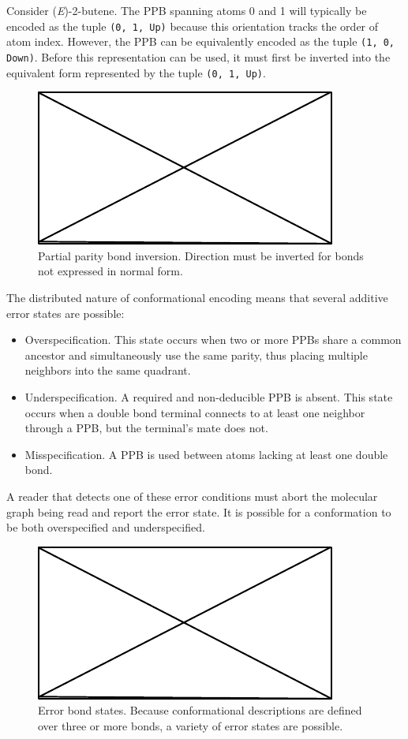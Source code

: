 \documentclass{article}
\def\ttt{\texttt}
\begin{document}
Consider (\textit{E})-2-butene. The PPB spanning atoms 0 and 1 will typically be encoded as the tuple \ttt{(0, 1, Up)} because this orientation tracks the order of atom index. However, the PPB can be equivalently encoded as the tuple \ttt{(1, 0, Down)}. Before this representation can be used, it must first be inverted into the equivalent form represented by the tuple \ttt{(0, 1, Up)}.

\begin{figure}
    \centering
    \includegraphics{filler}
    \caption{Partial parity bond inversion. Direction must be inverted for bonds not expressed in normal form.}
    \label{fig:ppb-inversion}
\end{figure}

The distributed nature of conformational encoding means that several additive error states are possible:

\begin{itemize}
    \item{Overspecification. This state occurs when two or more PPBs share a common ancestor and simultaneously use the same parity, thus placing multiple neighbors into the same quadrant.}
    \item{Underspecification. A required and non-deducible PPB is absent. This state occurs when a double bond terminal connects to at least one neighbor through a PPB, but the terminal's mate does not.}
    \item{ Misspecification. A PPB is used between atoms lacking at least one double bond.}
\end{itemize}

A reader that detects one of these error conditions must abort the molecular graph being read and report the error state. It is possible for a conformation to be both overspecified and underspecified.

\begin{figure}
    \centering
    \includegraphics{filler}
    \caption{Error bond states. Because conformational descriptions are defined over three or more bonds, a variety of error states are possible.}
    \label{fig:bond-error-states}
\end{figure}
\end{document}
